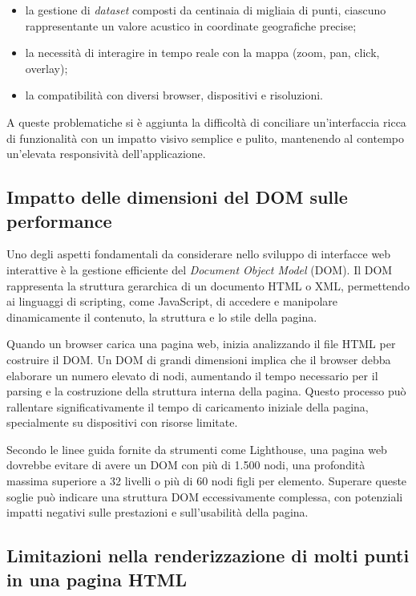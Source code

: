 \begin{itemize}
  \item la gestione di \textit{dataset} composti da centinaia di migliaia di
    punti, ciascuno rappresentante un valore acustico in coordinate geografiche precise;

  \item la necessità di interagire in tempo reale con la mappa (zoom, pan, click,
    overlay);

  \item la compatibilità con diversi browser, dispositivi e risoluzioni.
\end{itemize}

\noindent
A queste problematiche si è aggiunta la difficoltà di conciliare un'interfaccia
ricca di funzionalità con un impatto visivo semplice e pulito, mantenendo al contempo
un'elevata responsività dell'applicazione.

\subsection{Impatto delle dimensioni del DOM sulle performance}

Uno degli aspetti fondamentali da considerare nello sviluppo di interfacce web
interattive è la gestione efficiente del \textit{Document Object Model} (DOM).
Il DOM rappresenta la struttura gerarchica di un documento HTML o XML, permettendo
ai linguaggi di scripting, come JavaScript, di accedere e manipolare dinamicamente
il contenuto, la struttura e lo stile della pagina.

Quando un browser carica una pagina web, inizia analizzando il file HTML per costruire
il DOM. Un DOM di grandi dimensioni implica che il browser debba elaborare un
numero elevato di nodi, aumentando il tempo necessario per il parsing e la costruzione
della struttura interna della pagina. Questo processo può rallentare
significativamente il tempo di caricamento iniziale della pagina, specialmente su
dispositivi con risorse limitate.

Secondo le linee guida fornite da strumenti come Lighthouse, una pagina web
dovrebbe evitare di avere un DOM con più di 1.500 nodi, una profondità massima superiore
a 32 livelli o più di 60 nodi figli per elemento. Superare queste soglie può
indicare una struttura DOM eccessivamente complessa, con potenziali impatti negativi
sulle prestazioni e sull'usabilità della pagina. \cite{chrome-dom-size}

\subsection{Limitazioni nella renderizzazione di molti punti in una pagina HTML}

